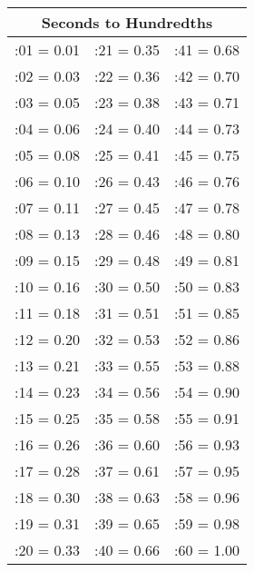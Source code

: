 \label{apdx:sec-to-hdth-conversion}
\begin{tabular}{ |c|c|c| }
  \hline
  \multicolumn{3}{|c|}{Seconds to Hundredths} \\
  \hline
  :01 = 0.01 & :21 = 0.35 & :41 = 0.68 \\
  :02 = 0.03 & :22 = 0.36 & :42 = 0.70 \\
  :03 = 0.05 & :23 = 0.38 & :43 = 0.71 \\
  :04 = 0.06 & :24 = 0.40 & :44 = 0.73 \\
  :05 = 0.08 & :25 = 0.41 & :45 = 0.75 \\
  \hline
  :06 = 0.10 & :26 = 0.43 & :46 = 0.76 \\
  :07 = 0.11 & :27 = 0.45 & :47 = 0.78 \\
  :08 = 0.13 & :28 = 0.46 & :48 = 0.80 \\
  :09 = 0.15 & :29 = 0.48 & :49 = 0.81 \\
  :10 = 0.16 & :30 = 0.50 & :50 = 0.83 \\
  \hline
  :11 = 0.18 & :31 = 0.51 & :51 = 0.85 \\
 :12 = 0.20 & :32 = 0.53 & :52 = 0.86 \\
 :13 = 0.21 & :33 = 0.55 & :53 = 0.88 \\
 :14 = 0.23 & :34 = 0.56 & :54 = 0.90 \\
 :15 = 0.25 & :35 = 0.58 & :55 = 0.91 \\
  \hline
  :16 = 0.26 & :36 = 0.60 & :56 = 0.93 \\
 :17 = 0.28 & :37 = 0.61 & :57 = 0.95 \\
 :18 = 0.30 & :38 = 0.63 & :58 = 0.96 \\
 :19 = 0.31 & :39 = 0.65 & :59 = 0.98 \\
 :20 = 0.33 & :40 = 0.66 & :60 = 1.00 \\
  \hline
\end{tabular}
